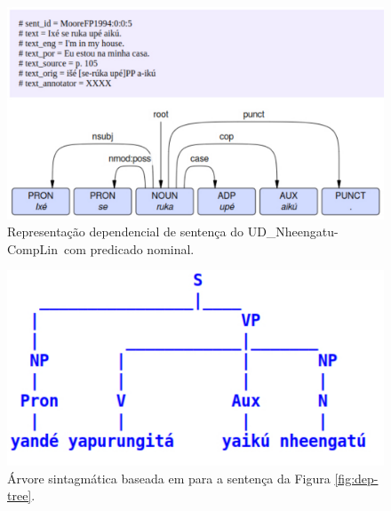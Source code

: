 \documentclass[portuguese]{textolivre}
\newcommand{\tbc}{UD\_Nheengatu-CompLin}
\begin{document}
\begin{figure}[htbp]
  \centering
  \begin{minipage}{.7\textwidth}
    \includegraphics[width=\linewidth]{figures/non-verbal.pdf}
    \caption{Representação dependencial de sentença do \tbc~com predicado nominal.}
    \label{fig:non-verbal}
  \end{minipage}
\end{figure}
 

\begin{figure}[htbp]
  \centering
  \begin{minipage}{.5\textwidth}
    \includegraphics[width=\linewidth]{figures/ctree-ascii.pdf}
    \caption{Árvore sintagmática baseada em \textcite{moore-facundes-pires-1994} para a sentença da Figura \ref{fig:dep-tree}.}
    \label{fig:ctree}
  \end{minipage}
\end{figure}
\end{document}
